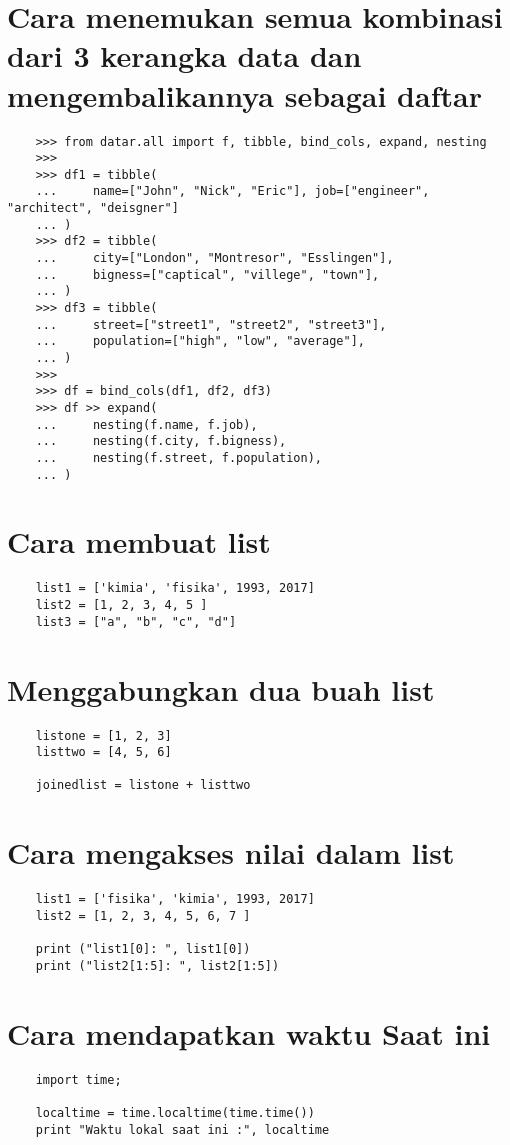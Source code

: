 \documentclass[12pt]{article} %
\begin{document}
\section{Cara menemukan semua kombinasi dari 3 kerangka data dan mengembalikannya sebagai daftar}
\begin{lstlisting}
	>>> from datar.all import f, tibble, bind_cols, expand, nesting
	>>> 
	>>> df1 = tibble(
	...     name=["John", "Nick", "Eric"], job=["engineer", "architect", "deisgner"]
	... )
	>>> df2 = tibble(
	...     city=["London", "Montresor", "Esslingen"],
	...     bigness=["captical", "villege", "town"],
	... )
	>>> df3 = tibble(
	...     street=["street1", "street2", "street3"],
	...     population=["high", "low", "average"],
	... )
	>>> 
	>>> df = bind_cols(df1, df2, df3)
	>>> df >> expand(
	...     nesting(f.name, f.job),
	...     nesting(f.city, f.bigness),
	...     nesting(f.street, f.population),
	... )
\end{lstlisting}
	
\section {Cara membuat list}
\begin {lstlisting}
	list1 = ['kimia', 'fisika', 1993, 2017]
	list2 = [1, 2, 3, 4, 5 ]
	list3 = ["a", "b", "c", "d"]
\end {lstlisting}
	
\section {Menggabungkan dua buah list}
\begin{lstlisting}
	listone = [1, 2, 3]
	listtwo = [4, 5, 6]
		
	joinedlist = listone + listtwo
\end{lstlisting}
	
\section {Cara mengakses nilai dalam list}
\begin{lstlisting}
	list1 = ['fisika', 'kimia', 1993, 2017]
	list2 = [1, 2, 3, 4, 5, 6, 7 ]
		
	print ("list1[0]: ", list1[0])
	print ("list2[1:5]: ", list2[1:5])
\end{lstlisting}
	
\section{Cara mendapatkan waktu Saat ini}
\begin {lstlisting}
	import time;
	
	localtime = time.localtime(time.time())
	print "Waktu lokal saat ini :", localtime
\end{lstlisting}
\end{document}
